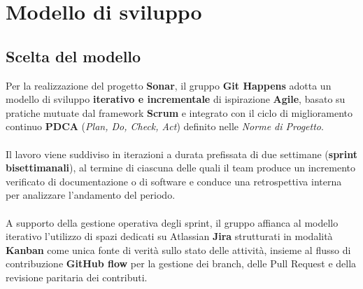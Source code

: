 \newpage

\section{Modello di sviluppo}

\subsection{Scelta del modello}
Per la realizzazione del progetto \textbf{Sonar}, il gruppo \textbf{Git Happens} adotta un modello di sviluppo \textbf{iterativo e incrementale} di ispirazione \textbf{Agile}, basato su pratiche mutuate dal framework \textbf{Scrum} e integrato con il ciclo di miglioramento continuo \textbf{PDCA} (\textit{Plan, Do, Check, Act}) definito nelle \textit{Norme di Progetto}. \\
\\
Il lavoro viene suddiviso in iterazioni a durata prefissata di due settimane (\textbf{sprint bisettimanali}), al termine di ciascuna delle quali il team produce un incremento verificato di documentazione o di software e conduce una retrospettiva interna per analizzare l'andamento del periodo. \\
\\
A supporto della gestione operativa degli sprint, il gruppo affianca al modello iterativo l'utilizzo di spazi dedicati su Atlassian \textbf{Jira} strutturati in modalità \textbf{Kanban} come unica fonte di verità sullo stato delle attività, insieme al flusso di contribuzione \textbf{GitHub flow} per la gestione dei branch, delle Pull Request e della revisione paritaria dei contributi.

